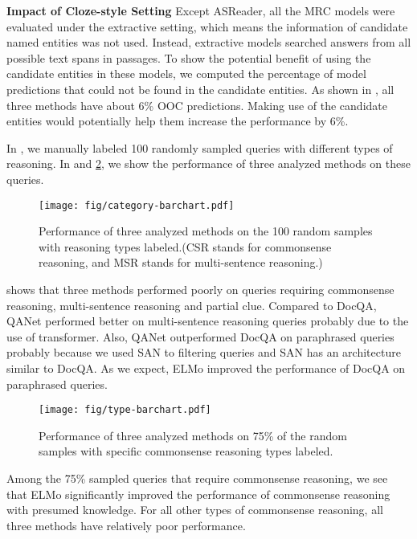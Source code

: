 \noindent\textbf{Impact of Cloze-style Setting}
Except ASReader, all the MRC models were evaluated under the extractive setting, which means the information of candidate named entities was not used.
Instead, extractive models searched answers from all possible text spans in passages.
To show the potential benefit of using the candidate entities in these models, we computed the percentage of model predictions that could not be found in the candidate entities. 
As shown in , all three methods have about 6\% OOC predictions. 
Making use of the candidate entities would potentially help them increase the performance by 6\%.

In , we manually labeled 100 randomly sampled queries with different types of reasoning.
In  and \ref{fig:baselines-eval-on-commonsense-types}, we show the performance of three analyzed methods on these queries. 

\begin{figure}[!ht]
\centering
\texttt{[image: fig/category-barchart.pdf]}
\caption{Performance of three analyzed methods on the 100 random samples with reasoning types labeled.(CSR stands for commonsense reasoning, and MSR stands for multi-sentence reasoning.)\label{fig:baselines-eval-on-question-types}}
\end{figure}

 shows that three methods performed poorly on queries requiring commonsense reasoning, multi-sentence reasoning and partial clue.
Compared to DocQA, QANet performed better on multi-sentence reasoning queries probably due to the use of transformer.
Also, QANet outperformed DocQA on paraphrased queries probably because we used SAN to filtering queries and SAN has an architecture similar to DocQA.
As we expect, ELMo improved the performance of DocQA on paraphrased queries.

\begin{figure}[!ht]
\centering
\texttt{[image: fig/type-barchart.pdf]}
\caption{Performance of three analyzed methods on 75\% of the random samples with specific commonsense reasoning types labeled.\label{fig:baselines-eval-on-commonsense-types}}
\end{figure}

Among the 75\% sampled queries that require commonsense reasoning, we see that ELMo significantly improved the performance of commonsense reasoning with presumed knowledge.
For all other types of commonsense reasoning, all three methods have relatively poor performance.

